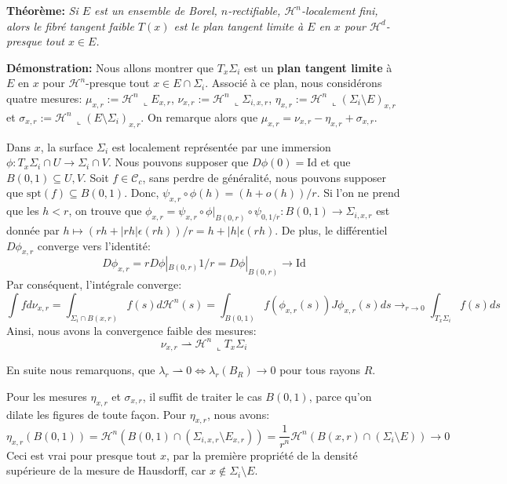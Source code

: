 \documentclass{article}
\begin{document}
\vspace{2ex}
\textbf{Théorème:} \textit{Si $E$ est un ensemble de Borel, $n$-rectifiable,
$\mathcal{H}^n$-localement fini, alors le fibré tangent faible $T(x)$ est le
plan tangent limite à $E$ en $x$ pour $\mathcal{H}^d$-presque tout $x\in E$.}

\vspace{1ex}
\textbf{Démonstration:}
Nous allons montrer que $T_x\Sigma_i$ est un \textbf{plan tangent limite} à $E$
en $x$ pour $\mathcal H^n$-presque tout $x\in E\cap\Sigma_i$. Associé à ce
plan, nous considérons quatre mesures: $\mu_{x,r}:=\mathcal H^n\,\llcorner
E_{x,r}$, $\nu_{x,r}:=\mathcal H^n\,\llcorner\Sigma_{i,x,r}$, $\eta_{x,r}:=
\mathcal H^n\,\llcorner (\Sigma_i\setminus E)_{x,r}$ et $\sigma_{x,r}:=\mathcal
H^n\,\llcorner (E\setminus\Sigma_i)_{x,r}$. On remarque alors que
$\mu_{x,r}=\nu_{x,r}-\eta_{x,r}+\sigma_{x,r}$.

\vspace{1ex}
Dans $x$, la surface $\Sigma_i$ est localement représentée par une immersion
$\phi: T_x\Sigma_i \cap U \rightarrow \Sigma_i \cap V$. Nous pouvons supposer
que $D\phi(0)=\text{Id}$ et que $B(0,1)\subseteq U,V$. Soit $f\in\mathcal
C_c$, sans perdre de généralité, nous pouvons supposer que $\text{spt}(f)
\subseteq B(0,1)$. Donc, $\psi_{x,r}\circ \phi(h)=(h+o(h))/r$. Si l'on ne prend que les $h<r$, on
trouve que $\phi_{x,r}=\psi_{x,r}\circ \phi|_{B(0,r)}\circ \psi_{0,1/r}:B(0,1)
\rightarrow \Sigma_{i,x,r}$ est donnée par $h\mapsto (rh+|rh|\epsilon(rh))/r=h+|h|
\epsilon(rh)$.
De plus, le différentiel $D\phi_{x,r}$ converge vers l'identité:
\[D\phi_{x,r}=rD\phi|_{B(0,r)}1/r=D\phi|_{B(0,r)}\rightarrow \text{Id}\]
Par conséquent, l'intégrale converge:
\[\int fd\nu_{x,r}=\int_{\Sigma_i\cap B(x,r)}f(s)d\mathcal H^n(s)=\int_{B(0,1)}
f(\phi_{x,r}(s)) J\phi_{x,r}(s)ds\rightarrow_{r\rightarrow 0}\int_{T_x\Sigma_i}
f(s)ds\]
Ainsi, nous avons la convergence faible des mesures:
\[\nu_{x,r}\rightharpoonup\mathcal H^n\,\llcorner T_x\Sigma_i\]

\vspace{1ex}
En suite nous remarquons, que $\lambda_r\rightharpoonup 0\Leftrightarrow
\lambda_r(B_R)\rightarrow 0$ pour tous rayons $R$.

\vspace{1ex}
Pour les mesures $\eta_{x,r}$ et $\sigma_{x,r}$, il suffit de traiter le cas
$B(0,1)$, parce qu'on dilate les figures de toute façon. Pour $\eta_{x,r}$,
nous avons:
\[\eta_{x,r}(B(0, 1))=\mathcal H^n(B(0, 1)\cap(\Sigma_{i,x,r}\setminus E_{x,r}))=
\frac{1}{r^n}\mathcal H^n(B(x,r)\cap(\Sigma_i\setminus E))\rightarrow 0\]
Ceci est vrai pour presque tout $x$, par la première propriété de la densité
supérieure de la mesure de Hausdorff, car $x \notin \Sigma_i \setminus E$.
\end{document}
